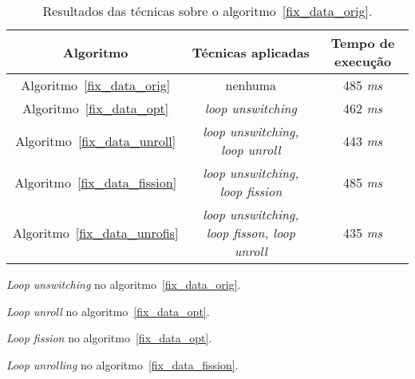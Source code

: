 \begin{table}[H]
  \caption{Resultados das técnicas sobre o algoritmo~\ref{fix_data_orig}.}
  \label{tabela_fix_data}
\begin{center}
  \begin{tabular}{c|c|c}
    Algoritmo & Técnicas aplicadas & Tempo de execução\\
    \hline
    Algoritmo~\ref{fix_data_orig} & nenhuma & 485 \textit{ms} \\
    \hline
    Algoritmo~\ref{fix_data_opt} & \textit{loop unswitching} & 462 \textit{ms} \\
    \hline
    Algoritmo~\ref{fix_data_unroll} & \textit{loop unswitching, loop unroll} & 443 \textit{ms} \\
    \hline
    Algoritmo~\ref{fix_data_fission} & \textit{loop unswitching, loop fission} & 485 \textit{ms} \\
    \hline
    Algoritmo~\ref{fix_data_unrofis} & \textit{loop unswitching, loop fisson,
                        loop unroll} & 435 \textit{ms} \\
    \hline
  \end{tabular}
\end{center}
\end{table}



\begin{algorithm}[H]
  \caption{\textit{Loop unswitching} no algoritmo~\ref{fix_data_orig}.}
    \label{fix_data_opt}

\end{algorithm}

\begin{algorithm}[H]
  \caption{\textit{Loop unroll} no algoritmo~\ref{fix_data_opt}.}
    \label{fix_data_unroll}

\end{algorithm}

\begin{algorithm}[H]
  \caption{\textit{Loop fission} no algoritmo~\ref{fix_data_opt}.}
    \label{fix_data_fission}

\end{algorithm}

\begin{algorithm}[H]
  \caption{\textit{Loop unrolling} no algoritmo~\ref{fix_data_fission}.}
    \label{fix_data_unrofis}

\end{algorithm}

